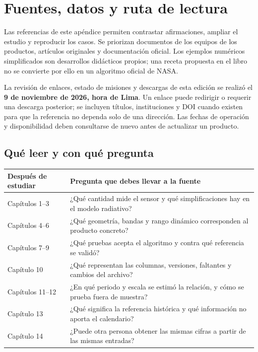 \chapter{Fuentes, datos y ruta de lectura}\label{ap:fuentes}

Las referencias de este apéndice permiten contrastar afirmaciones, ampliar el estudio y
reproducir los casos. Se priorizan documentos de los equipos de los productos, artículos
originales y documentación oficial. Los ejemplos numéricos simplificados son desarrollos
didácticos propios; una receta propuesta en el libro no se convierte por ello en un
algoritmo oficial de NASA.

La revisión de enlaces, estado de misiones y descargas de esta edición se realizó el
\textbf{9 de noviembre de 2026, hora de Lima}. Un enlace puede redirigir o requerir una
descarga posterior; se incluyen títulos, instituciones y DOI cuando existen para que
la referencia no dependa solo de una dirección. Las fechas de operación y disponibilidad
deben consultarse de nuevo antes de actualizar un producto.

\section{Qué leer y con qué pregunta}

\begin{center}
\renewcommand{\arraystretch}{1.2}
\begin{tabularx}{\textwidth}{l>{\raggedright\arraybackslash}X}
\toprule
Después de estudiar & Pregunta que debes llevar a la fuente \\
\midrule
Capítulos 1--3 & ¿Qué cantidad mide el sensor y qué simplificaciones hay en el modelo radiativo? \\
Capítulos 4--6 & ¿Qué geometría, bandas y rango dinámico corresponden al producto concreto? \\
Capítulos 7--9 & ¿Qué pruebas acepta el algoritmo y contra qué referencia se validó? \\
Capítulo 10 & ¿Qué representan las columnas, versiones, faltantes y cambios del archivo? \\
Capítulos 11--12 & ¿En qué periodo y escala se estimó la relación, y cómo se prueba fuera de muestra? \\
Capítulo 13 & ¿Qué significa la referencia histórica y qué información no aporta el calendario? \\
Capítulo 14 & ¿Puede otra persona obtener las mismas cifras a partir de las mismas entradas? \\
\bottomrule
\end{tabularx}
\end{center}

